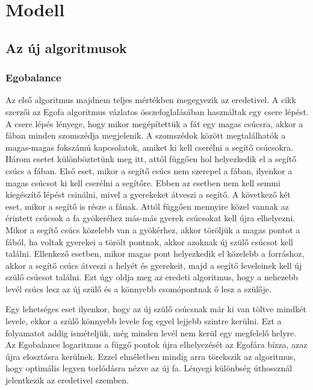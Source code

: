 \documentclass[12pt]{report}
\begin{document}
\chapter{Modell}

\section{Az új algoritmusok}

\subsection{Egobalance}

Az első algoritmus majdnem teljes mértékben megegyezik az eredetivel.
A cikk szerzői az Egofa algoritmus vázlatos összefoglalásában használtak egy csere lépést.
A csere lépés lényege, hogy mikor megépítettük a fát egy magas csúcsra, akkor a fában minden szomszédja megjelenik.
A szomszédok között megtalálhatók a magas-magas fokszámú kapcsolatok, amiket ki kell cserélni a segítő csúcsokra.
Három esetet különböztetünk meg itt, attól függően hol helyezkedik el a segítő csúcs a fában.
Első eset, mikor a segítő csúcs nem szerepel a fában, ilyenkor a magas csúcsot ki kell cserélni a segítőre. Ebben az esetben nem kell semmi kiegészítő lépést csinálni, mivel a gyerekeket átveszi a segítő.
A következő két eset, mikor a segítő is része a fának. 
Attól függően mennyire közel vannak az érintett csúcsok a fa gyökeréhez más-más gyerek csúcsokat kell újra elhelyezni.
Mikor a segítő csúcs közelebb van a gyökérhez, akkor töröljük a magas pontot a fából, ha voltak gyerekei a törölt pontnak, akkor azoknak új szülő csúcsot kell találni.
Ellenkező esetben, mikor magas pont helyezkedik el közelebb a forráshoz, akkor a segítő csúcs átveszi a helyét és gyerekeit, majd a segítő leveleinek kell új szülő csúcsot találni. 
Ezt úgy oldja meg az eredeti algoritmus, hogy a nehezebb levél csúcs lesz az új szülő és a könnyebb csomópontnak ő lesz a szülője.

Egy lehetséges eset ilyenkor, hogy az új szülő csúcsnak már ki van töltve mindkét levele, ekkor a szülő könnyebb levele fog egyel lejjebb szintre kerülni.
Ezt a folyamatot addig ismételjük, még minden levél nem kerül egy megfelelő helyre.
Az Egobalance logaritmus a függő pontok újra elhelyezését az Egofára bízza, azaz újra elosztásra kerülnek.
Ezzel elméletben mindig arra törekszik az algoritmus, hogy optimális legyen torlódásra nézve az új fa.
Lényegi különbség úthossznál jelentkezik az eredetivel szemben.
\end{document}
